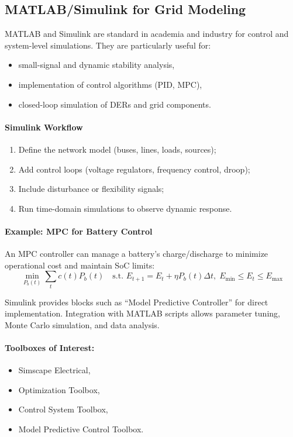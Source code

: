 \documentclass[11pt]{article}
\begin{document}
	
	\subsection{MATLAB/Simulink for Grid Modeling}
	
	MATLAB and Simulink are standard in academia and industry for control and system-level simulations.  
	They are particularly useful for:
	\begin{itemize}
		\item small-signal and dynamic stability analysis,
		\item implementation of control algorithms (PID, MPC),
		\item closed-loop simulation of DERs and grid components.
	\end{itemize}
	
	\paragraph{Simulink Workflow}
	\begin{enumerate}
		\item Define the network model (buses, lines, loads, sources);
		\item Add control loops (voltage regulators, frequency control, droop);
		\item Include disturbance or flexibility signals;
		\item Run time-domain simulations to observe dynamic response.
	\end{enumerate}
	
	\paragraph{Example: MPC for Battery Control}
	An MPC controller can manage a battery's charge/discharge to minimize operational cost and maintain SoC limits:
	\[
	\min_{P_b(t)} \sum_t c(t) P_b(t)
	\quad \text{s.t. } E_{t+1} = E_t + \eta P_b(t) \Delta t, \;
	E_{\min} \le E_t \le E_{\max}
	\]
	
	Simulink provides blocks such as “Model Predictive Controller” for direct implementation.  
	Integration with MATLAB scripts allows parameter tuning, Monte Carlo simulation, and data analysis.
	
	\paragraph{Toolboxes of Interest:}
	\begin{itemize}
		\item Simscape Electrical,
		\item Optimization Toolbox,
		\item Control System Toolbox,
		\item Model Predictive Control Toolbox.
	\end{itemize}
	
\end{document}
